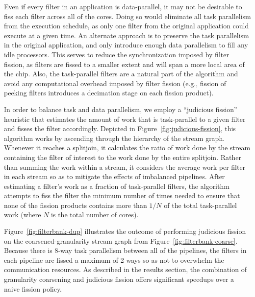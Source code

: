 Even if every filter in an application is data-parallel, it may not be
desirable to fiss each filter across all of the cores.  Doing so would
eliminate all task parallelism from the execution schedule, as only
one filter from the original application could execute at a given
time.  An alternate approach is to preserve the task parallelism in
the original application, and only introduce enough data parallelism
to fill any idle processors.  This serves to reduce the
synchronization imposed by filter fission, as filters are fissed to a
smaller extent and will span a more local area of the chip.  Also, the
task-parallel filters are a natural part of the algorithm and avoid
any computational overhead imposed by filter fission (e.g., fission of
peeking filters introduces a decimation stage on each fission
product).

In order to balance task and data parallelism, we employ a ``judicious
fission'' heuristic that estimates the amount of work that is
task-parallel to a given filter and fisses the filter accordingly.
Depicted in Figure~\ref{fig:judicious-fission}, this algorithm works
by ascending through the hierarchy of the stream graph.  Whenever it
reaches a splitjoin, it calculates the ratio of work done by the
stream containing the filter of interest to the work done by the
entire splitjoin.  Rather than summing the work within a stream, it
considers the average work per filter in each stream so as to mitigate
the effects of imbalanced pipelines.  After estimating a filter's work as a fraction of
task-parallel filters, the algorithm attempts to fiss the filter the
minimum number of times needed to ensure that none of the fission
products contains more than $1/N$ of the total task-parallel work
(where $N$ is the total number of cores).

Figure~\ref{fig:filterbank-dup} illustrates the outcome of performing
judicious fission on the coarsened-granularity stream graph from
Figure~\ref{fig:filterbank-coarse}.  Because there is 8-way task
parallelism between all of the pipelines, the filters in each pipeline
are fissed a maximum of 2 ways so as not to overwhelm the
communication resources.  As described in the results section, the
combination of granularity coarsening and judicious fission offers
significant speedups over a naive fission policy.
